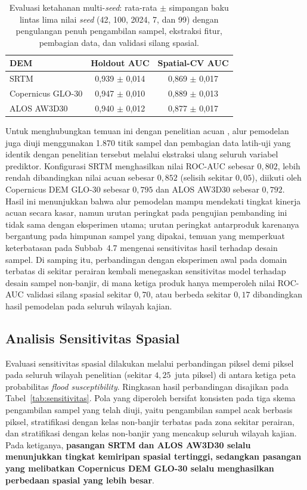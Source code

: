 \documentclass[12pt]{article}
\begin{document}
\begin{table}[ht]
\centering
\caption{Evaluasi ketahanan multi-\textit{seed}: rata-rata $\pm$ simpangan baku lintas lima nilai \textit{seed} (42, 100, 2024, 7, dan 99) dengan pengulangan penuh pengambilan sampel, ekstraksi fitur, pembagian data, dan validasi silang spasial.}
\label{tab:multiseed}
\begin{tabular}{lcc}
\toprule
\textbf{DEM} & \textbf{Holdout AUC} & \textbf{Spatial-CV AUC} \\
\midrule
SRTM               & 0,939 $\pm$ 0,014 & 0,869 $\pm$ 0,017 \\
Copernicus GLO-30  & 0,947 $\pm$ 0,010 & 0,889 $\pm$ 0,013 \\
ALOS AW3D30        & 0,940 $\pm$ 0,012 & 0,877 $\pm$ 0,017 \\
\bottomrule
\end{tabular}
\end{table}

Untuk menghubungkan temuan ini dengan penelitian acuan \cite{hakim2026}, alur
pemodelan juga diuji menggunakan 1.870 titik sampel dan pembagian data
latih-uji yang identik dengan penelitian tersebut melalui ekstraksi ulang
seluruh variabel prediktor. Konfigurasi SRTM menghasilkan nilai ROC-AUC
sebesar $0{,}802$, lebih rendah dibandingkan nilai acuan sebesar $0{,}852$
(selisih sekitar $0{,}05$), diikuti oleh Copernicus DEM GLO-30 sebesar
$0{,}795$ dan ALOS AW3D30 sebesar $0{,}792$. Hasil ini menunjukkan bahwa alur
pemodelan mampu mendekati tingkat kinerja acuan secara kasar, namun urutan
peringkat pada pengujian pembanding ini tidak sama dengan eksperimen utama;
urutan peringkat antarproduk karenanya bergantung pada himpunan sampel yang
dipakai, temuan yang memperkuat keterbatasan pada Subbab~4.7 mengenai
sensitivitas hasil terhadap desain sampel. Di samping itu, perbandingan
dengan eksperimen awal pada domain terbatas di sekitar perairan kembali
menegaskan sensitivitas model terhadap desain sampel
non-banjir, di mana ketiga produk hanya memperoleh nilai ROC-AUC validasi
silang spasial sekitar $0{,}70$, atau berbeda sekitar $0{,}17$ dibandingkan
hasil pemodelan pada seluruh wilayah kajian.

\subsection{Analisis Sensitivitas Spasial}

Evaluasi sensitivitas spasial dilakukan melalui perbandingan piksel demi
piksel pada seluruh wilayah penelitian (sekitar $4{,}25$~juta piksel) di
antara ketiga peta probabilitas \textit{flood susceptibility}. Ringkasan hasil
perbandingan disajikan pada Tabel~\ref{tab:sensitivitas}. Pola yang diperoleh
bersifat konsisten pada tiga skema pengambilan sampel yang telah diuji, yaitu
pengambilan sampel acak berbasis piksel, stratifikasi dengan kelas non-banjir
terbatas pada zona sekitar perairan, dan stratifikasi dengan kelas non-banjir
yang mencakup seluruh wilayah kajian. Pada ketiganya, \textbf{pasangan SRTM
dan ALOS AW3D30 selalu menunjukkan
tingkat kemiripan spasial tertinggi, sedangkan pasangan yang melibatkan
Copernicus DEM GLO-30 selalu menghasilkan perbedaan spasial yang lebih besar}.
\end{document}

